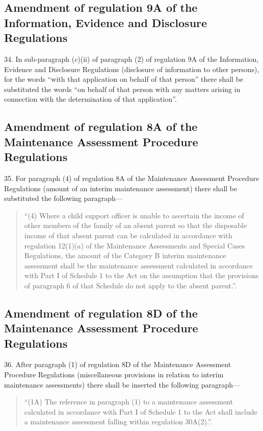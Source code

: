\documentclass[12pt,a4paper]{article}
\begin{document}
\subsection[34. Amendment of regulation 9A of the Information, Evidence and Disclosure Regulations]{Amendment of regulation 9A of the Information, Evidence and Disclosure Regulations}

34.  In sub-paragraph ($c$)(ii) of paragraph (2) of regulation 9A of the Information, Evidence and Disclosure Regulations (disclosure of information to other persons), for the words “with that application on behalf of that person” there shall be substituted the words “on behalf of that person with any matters arising in connection with the determination of that application”.

\subsection[35. Amendment of regulation 8A of the Maintenance Assessment Procedure Regulations]{Amendment of regulation 8A of the Maintenance Assessment Procedure Regulations}

35.  For paragraph (4) of regulation 8A of the Maintenance Assessment Procedure Regulations (amount of an interim maintenance assessment) there shall be substituted the following paragraph—
\begin{quotation}
“(4) Where a child support officer is unable to ascertain the income of other members of the family of an absent parent so that the disposable income of that absent parent can be calculated in accordance with regulation 12(1)($a$) of the Maintenance Assessments and Special Cases Regulations, the amount of the Category B interim maintenance assessment shall be the maintenance assessment calculated in accordance with Part I of Schedule 1 to the Act on the assumption that the provisions of paragraph 6 of that Schedule do not apply to the absent parent.”.
\end{quotation}

\subsection[36. Amendment of regulation 8D of the Maintenance Assessment Procedure Regulations]{Amendment of regulation 8D of the Maintenance Assessment Procedure Regulations}

36.  After paragraph (1) of regulation 8D of the Maintenance Assessment Procedure Regulations (miscellaneous provisions in relation to interim maintenance assessments) there shall be inserted the following paragraph—
\begin{quotation}
“(1A) The reference in paragraph (1) to a maintenance assessment calculated in accordance with Part I of Schedule 1 to the Act shall include a maintenance assessment falling within regulation 30A(2).”.
\end{quotation}
\end{document}
